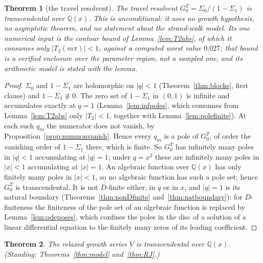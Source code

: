 \documentclass[11pt]{article}
\theoremstyle{plain}
\newtheorem{theorem}{Theorem}
\theoremstyle{definition}
\theoremstyle{remark}
\newcommand{\Q}{\mathbb{Q}}
\begin{document}
\begin{theorem}[the travel resolvent]\label{thm:travelres}
The travel resolvent $G^T_0=\Sigma_0/(1-\Sigma_1)$ is transcendental over $\Q(x)$. This is
unconditional: it uses no growth hypothesis, no asymptotic theorem, and no statement about the
strand-walk model. Its one numerical input is the contour bound of Lemma~\ref{lem:T2abs}, of which
it consumes only $|T_2(m\pi)|<1$, against a computed worst value $0.027$; that bound is a verified
enclosure over the parameter region, not a sampled one, and its arithmetic model is stated with the
lemma.
\end{theorem}

\begin{proof}
$\Sigma_0$ and $1-\Sigma_1$ are holomorphic on $|q|<1$ (Theorem~\ref{thm:blocks}, first clause) and
$1-\Sigma_1\not\equiv0$. The zero set of $1-\Sigma_1$ in $(0,1)$ is infinite and accumulates
exactly at $q=1$ (Lemma~\ref{lem:infpoles}, which consumes from Lemma~\ref{lem:T2abs} only
$|T_2|<1$, together with Lemma~\ref{lem:polefinite}). At each such $q_m$ the numerator does not
vanish, by Proposition~\ref{prop:numnonvanish}. Hence every $q_m$ is a pole of $G^T_0$, of order
the vanishing order of $1-\Sigma_1$ there, which is finite. So $G^T_0$ has infinitely many poles in
$|q|<1$ accumulating at $|q|=1$; under $q=x^2$ these are infinitely many poles in $|x|<1$
accumulating at $|x|=1$. An algebraic function over $\Q(x)$ has only finitely many poles in
$|x|<1$, so no algebraic function has such a pole set; hence $G^T_0$ is transcendental. It is not
$D$-finite either, in $q$ or in $x$, and $|q|=1$ is its natural boundary
(Theorems~\ref{thm:nonDfinite} and~\ref{thm:natboundary}): for $D$-finiteness the finiteness of the
pole set of an algebraic function is replaced by Lemma~\ref{lem:odeposes}, which confines the poles
in the disc of a solution of a linear differential equation to the finitely many zeros of its
leading coefficient.
\end{proof}

\begin{theorem}\label{thm:V}
The relaxed growth series $V$ is transcendental over $\Q(x)$.
\textup{(}Standing: Theorems~\ref{thm:model} and~\ref{thm:RJ}.\textup{)}
\end{theorem}
\end{document}
